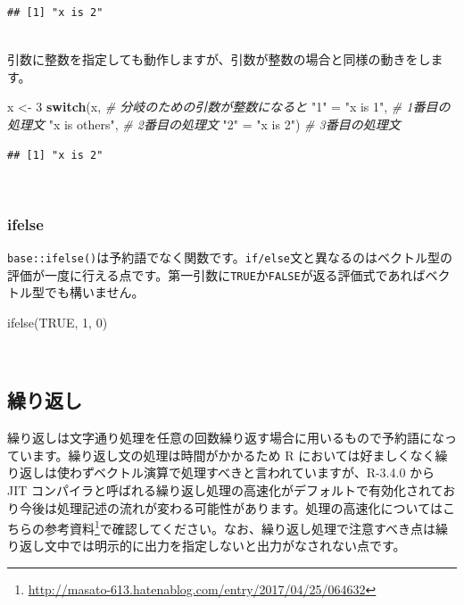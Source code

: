 \documentclass[
  12pt,
]{book}
\newenvironment{Shaded}{\begin{snugshade}}{\end{snugshade}}
\newcommand{\CommentTok}[1]{\textcolor[rgb]{0.56,0.35,0.01}{\textit{#1}}}
\newcommand{\ConstantTok}[1]{\textcolor[rgb]{0.00,0.00,0.00}{#1}}
\newcommand{\ControlFlowTok}[1]{\textcolor[rgb]{0.13,0.29,0.53}{\textbf{#1}}}
\newcommand{\DecValTok}[1]{\textcolor[rgb]{0.00,0.00,0.81}{#1}}
\newcommand{\FunctionTok}[1]{\textcolor[rgb]{0.00,0.00,0.00}{#1}}
\newcommand{\NormalTok}[1]{#1}
\newcommand{\OtherTok}[1]{\textcolor[rgb]{0.56,0.35,0.01}{#1}}
\newcommand{\StringTok}[1]{\textcolor[rgb]{0.31,0.60,0.02}{#1}}
\DeclareRobustCommand{\href}[2]{#2\footnote{\url{#1}}}
\begin{document}
\begin{verbatim}
## [1] "x is 2"
\end{verbatim}

　\\
引数に整数を指定しても動作しますが、引数が整数の場合と同様の動きをします。

\begin{Shaded}
\begin{Highlighting}[]
\NormalTok{x }\OtherTok{\textless{}{-}} \DecValTok{3}
\ControlFlowTok{switch}\NormalTok{(x,                 }\CommentTok{\# 分岐のための引数が整数になると}
       \StringTok{"1"} \OtherTok{=} \StringTok{"x is 1"}\NormalTok{,    }\CommentTok{\# 1番目の処理文}
       \StringTok{"x is others"}\NormalTok{,     }\CommentTok{\# 2番目の処理文}
       \StringTok{"2"} \OtherTok{=} \StringTok{"x is 2"}\NormalTok{)    }\CommentTok{\# 3番目の処理文}
\end{Highlighting}
\end{Shaded}

\begin{verbatim}
## [1] "x is 2"
\end{verbatim}

　

\hypertarget{ifelse}{%
\subsubsection{ifelse}\label{ifelse}}

\texttt{base::ifelse()}は予約語でなく関数です。\texttt{if/else}文と異なるのはベクトル型の評価が一度に行える点です。第一引数に\texttt{TRUE}か\texttt{FALSE}が返る評価式であればベクトル型でも構いません。

\begin{Shaded}
\begin{Highlighting}[]
\FunctionTok{ifelse}\NormalTok{(}\ConstantTok{TRUE}\NormalTok{, }\DecValTok{1}\NormalTok{, }\DecValTok{0}\NormalTok{)}
\end{Highlighting}
\end{Shaded}

　

\hypertarget{ux7e70ux308aux8fd4ux3057}{%
\subsection{繰り返し}\label{ux7e70ux308aux8fd4ux3057}}

繰り返しは文字通り処理を任意の回数繰り返す場合に用いるもので予約語になっています。繰り返し文の処理は時間がかかるため R においては好ましくなく繰り返しは使わずベクトル演算で処理すべきと言われていますが、R-3.4.0 から JIT コンパイラと呼ばれる繰り返し処理の高速化がデフォルトで有効化されており今後は処理記述の流れが変わる可能性があります。処理の高速化についてはこちらの\href{http://masato-613.hatenablog.com/entry/2017/04/25/064632}{参考資料}で確認してください。なお、繰り返し処理で注意すべき点は繰り返し文中では明示的に出力を指定しないと出力がなされない点です。
\end{document}
